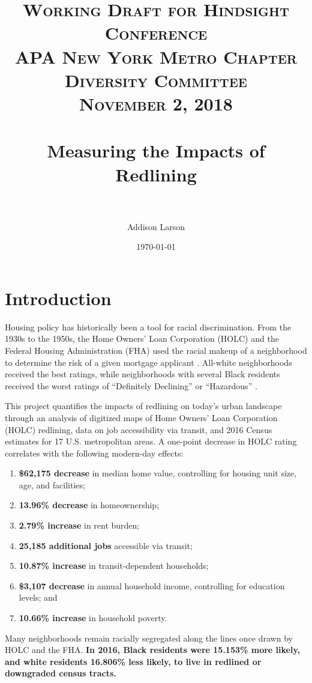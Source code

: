 \documentclass[paper=letter, fontsize=12pt]{scrartcl} %
\title{	
	\normalfont \normalsize 
	\textsc{Working Draft for Hindsight Conference\\APA New York Metro Chapter Diversity Committee\\November 2, 2018} \\ [6pt] %
	\horrule{1pt} \\[0.5cm] %
	\huge Measuring the Impacts of Redlining\\%
	\horrule{1pt}\\[0.5cm] %
}
\author{Addison Larson} %
\date{\normalsize{\today}} %
\begin{document}
	
	\maketitle %
	\newpage
	\tableofcontents
	\newcommand{\blankpage}{
		\newpage
		\mbox{}
		\newpage
	}
	\listoftables
	\listoffigures
	\section{Introduction}
	Housing policy has historically been a tool for racial discrimination. From the 1930s to the 1950s, the Home Owners' Loan Corporation (HOLC) and the Federal Housing Administration (FHA) used the racial makeup of a neighborhood to determine the risk of a given mortgage applicant \cite{rothstein}. All-white neighborhoods received the best ratings, while neighborhoods with several Black residents received the worst ratings of ``Definitely Declining'' or ``Hazardous'' \cite{richmond}.\par
	This project quantifies the impacts of redlining on today's urban landscape through an analysis of digitized maps of Home Owners' Loan Corporation (HOLC) redlining, data on job accessibility via transit, and 2016 Census estimates for 17 U.S. metropolitan areas. A one-point decrease in HOLC rating correlates with the following modern-day effects: 
	\begin{enumerate}
		\item \textbf{\$62,175 decrease} in median home value, controlling for housing unit size, age, and facilities;
		\item \textbf{13.96\% decrease} in homeownership;
		\item \textbf{2.79\% increase} in rent burden;
		\item \textbf{25,185 additional jobs} accessible via transit;
		\item \textbf{10.87\% increase} in transit-dependent households;
		\item \textbf{\$3,107 decrease} in annual household income, controlling for education levels; and
		\item \textbf{10.66\% increase} in household poverty.
	\end{enumerate}
	Many neighborhoods remain racially segregated along the lines once drawn by HOLC and the FHA. \textbf{In 2016, Black residents were 15.153\% more likely, and white residents 16.806\% less likely, to live in redlined or downgraded census tracts.}
	
\end{document}
